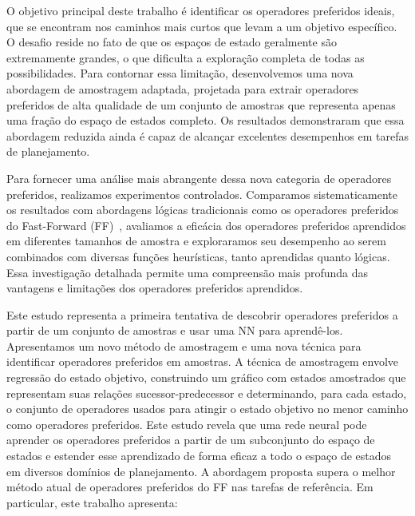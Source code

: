 \documentclass[ppgc,diss,english]{iiufrgs}
\begin{document}
O objetivo principal deste trabalho é identificar os operadores preferidos ideais, que se encontram nos caminhos mais curtos que levam a um objetivo específico. O desafio reside no fato de que os espaços de estado geralmente são extremamente grandes, o que dificulta a exploração completa de todas as possibilidades. Para contornar essa limitação, desenvolvemos uma nova abordagem de amostragem adaptada, projetada para extrair operadores preferidos de alta qualidade de um conjunto de amostras que representa apenas uma fração do espaço de estados completo. Os resultados demonstraram que essa abordagem reduzida ainda é capaz de alcançar excelentes desempenhos em tarefas de planejamento.


Para fornecer uma análise mais abrangente dessa nova categoria de operadores preferidos, realizamos experimentos controlados. Comparamos sistematicamente os resultados com abordagens lógicas tradicionais como os operadores preferidos do Fast-Forward (FF)~\cite{Hoffmann.Nebel/2001, Helmert/2006}, avaliamos a eficácia dos operadores preferidos aprendidos em diferentes tamanhos de amostra e exploraramos seu desempenho ao serem combinados com diversas funções heurísticas, tanto aprendidas quanto lógicas. Essa investigação detalhada permite uma compreensão mais profunda das vantagens e limitações dos operadores preferidos aprendidos.

Este estudo representa a primeira tentativa de descobrir operadores preferidos a partir de um conjunto de amostras e usar uma NN para aprendê-los. Apresentamos um novo método de amostragem e uma nova técnica para identificar operadores preferidos em amostras. A técnica de amostragem envolve regressão do estado objetivo, construindo um gráfico com estados amostrados que representam suas relações sucessor-predecessor e determinando, para cada estado, o conjunto de operadores usados para atingir o estado objetivo no menor caminho como operadores preferidos. Este estudo revela que uma rede neural pode aprender os operadores preferidos a partir de um subconjunto do espaço de estados e estender esse aprendizado de forma eficaz a todo o espaço de estados em diversos domínios de planejamento. A abordagem proposta supera o melhor método atual de operadores preferidos do FF nas tarefas de referência. Em particular, este trabalho apresenta:
\end{document}
